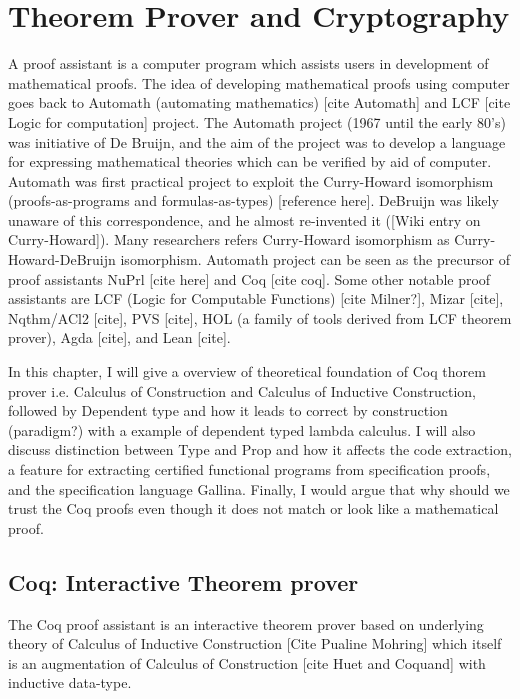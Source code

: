 \chapter{Theorem Prover and Cryptography}
\label{cha:theorem_crypto}
 

A proof assistant is a computer program which assists users in development of mathematical proofs. The idea of 
developing mathematical proofs using computer goes back to Automath (automating mathematics)
[cite Automath] and LCF [cite Logic for computation] project. The 
Automath project (1967 until the early 80's)  was initiative of De Bruijn, and the aim of the project was to develop
a language for expressing mathematical theories which can be verified by aid of computer.  Automath was first 
practical project to exploit the Curry-Howard isomorphism (proofs-as-programs and formulas-as-types)
 [reference here]. DeBruijn  was likely unaware of this correspondence, and he almost re-invented it 
 ([Wiki entry on Curry-Howard]). Many researchers refers Curry-Howard isomorphism as 
 Curry-Howard-DeBruijn isomorphism. Automath project can be seen as the precursor of
 proof assistants NuPrl [cite here] and Coq [cite coq].   Some other notable  proof assistants are 
 LCF (Logic for Computable Functions)  [cite Milner?], Mizar [cite], Nqthm/ACl2 [cite], PVS [cite], 
 HOL (a family of tools derived from LCF theorem prover), Agda [cite], and Lean [cite].


In this chapter, I will give a overview of theoretical foundation of 
Coq thorem prover i.e. Calculus of Construction and  
Calculus of Inductive Construction, followed by Dependent type 
and how it leads to 
correct by construction (paradigm?) with a example of dependent 
typed lambda calculus. I will also discuss distinction between Type and Prop 
and how it affects the code extraction, a feature for extracting 
certified functional programs from specification proofs, and the 
specification language Gallina. Finally, I would 
argue that why should we trust the Coq proofs even though it does not 
match or look like a mathematical proof.




\section{Coq: Interactive Theorem prover}
\label{sec:problemstatement}
The Coq proof assistant  is an interactive theorem prover based on
underlying theory of Calculus of 
Inductive Construction [Cite Pualine Mohring]  which itself is an 
augmentation of Calculus of Construction 
[cite Huet and Coquand] with inductive data-type.  
 

